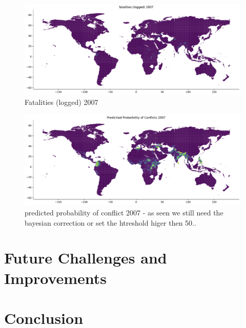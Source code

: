 \documentclass[a4paper]{article}
\begin{document}
\begin{figure}[!htb]
	\centering
	\includegraphics[scale=0.4]{log_conflicts_2007.pdf}
    \caption{\footnotesize{Fatalities (logged) 2007}}%
\end{figure}

\begin{figure}[!htb]
	\centering
	\includegraphics[scale=0.4]{pred_prob_conflicts_2007.pdf}
    \caption{\footnotesize{predicted probability of conflict 2007 - as seen we still need the bayesian correction or set the htreshold higer then 50..}}%
\end{figure}


\pagebreak

\section{Future Challenges and Improvements}


\section{Conclusion}

\end{document}
